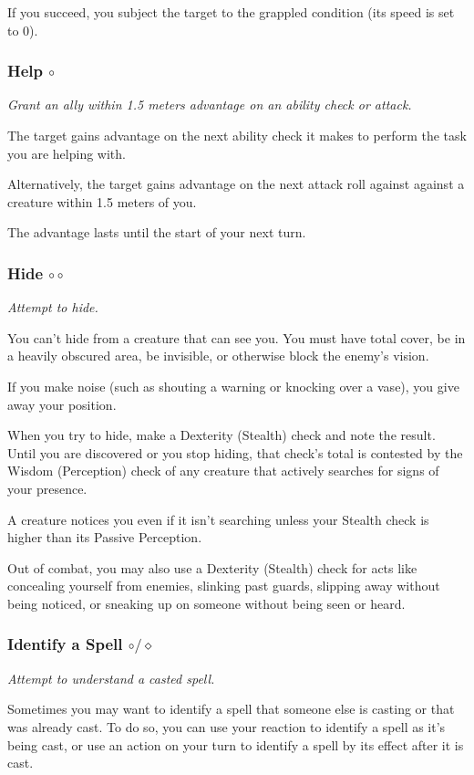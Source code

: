     If you succeed, you subject the target to the grappled condition (its speed is set to 0).

\subsubsection{Help $\circ$}
    \textit{Grant an ally within 1.5 meters advantage on an ability check or attack.}

    The target gains advantage on the next ability check it makes to perform the task you are helping with.

    Alternatively, the target gains advantage on the next attack roll against against a creature within 1.5 meters of you.

    The advantage lasts until the start of your next turn.

\subsubsection{Hide $\circ\circ$}
    \textit{Attempt to hide.}

    You can't hide from a creature that can see you.
    You must have total cover, be in a heavily obscured area, be invisible, or otherwise block the enemy's vision.

    If you make noise (such as shouting a warning or knocking over a vase), you give away your position.

    When you try to hide, make a Dexterity (Stealth) check and note the result.
    Until you are discovered or you stop hiding, that check's total is contested by the Wisdom (Perception) check of any creature that actively searches for signs of your presence.

    A creature notices you even if it isn't searching unless your Stealth check is higher than its Passive Perception.

    Out of combat, you may also use a Dexterity (Stealth) check for acts like concealing yourself from enemies, slinking past guards, slipping away without being noticed, or sneaking up on someone without being seen or heard.

\subsubsection{Identify a Spell $\circ/\diamond$}
    \textit{Attempt to understand a casted spell.}

    Sometimes you may want to identify a spell that someone else is casting or that was already cast.
    To do so, you can use your reaction to identify a spell as it's being cast, or use an action on your turn to identify a spell by its effect after it is cast.

